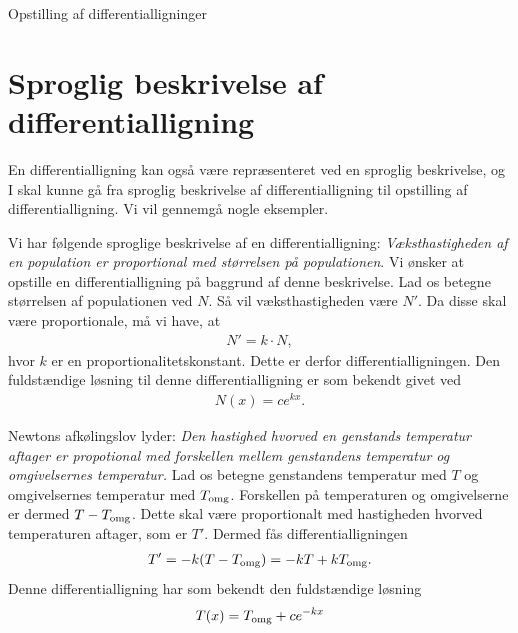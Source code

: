 \begin{center}
	\Huge
	Opstilling af differentialligninger
\end{center}

\section*{Sproglig beskrivelse af differentialligning}

En differentialligning kan også være repræsenteret ved en sproglig beskrivelse, og I skal kunne gå fra sproglig beskrivelse af differentialligning til opstilling af differentialligning. Vi vil gennemgå nogle eksempler. 

\begin{exa}
	Vi har følgende sproglige beskrivelse af en differentialligning: \textit{Væksthastigheden af en population er proportional med størrelsen på populationen}. Vi ønsker at opstille en
	differentialligning på baggrund af denne beskrivelse. Lad os betegne størrelsen af populationen ved $N$. Så vil væksthastigheden være $N'$. Da disse skal være proportionale, må vi have, at 
	\begin{align*}
		N' = k\cdot N,
	\end{align*}
	hvor $k$ er en proportionalitetskonstant. Dette er derfor differentialligningen. Den fuldstændige løsning til denne differentialligning er som bekendt givet ved
	\begin{align*}
		N(x) = ce^{kx}.
	\end{align*}
\end{exa}
\begin{exa}
	Newtons afkølingslov lyder: \textit{Den hastighed hvorved en genstands temperatur aftager er propotional med forskellen mellem genstandens temperatur og omgivelsernes temperatur.} Lad os betegne
	genstandens temperatur med $T$ og omgivelsernes temperatur med $T_{\textnormal{omg}}$. Forskellen på temperaturen og omgivelserne er dermed $T-T_{\textnormal{omg}}$. Dette skal være proportionalt 
	med hastigheden hvorved temperaturen aftager, som er $T'$. Dermed fås differentialligningen
	\begin{align*}
		T' = -k(T-T_{\textnormal{omg}}) = -kT + kT_{\textnormal{omg}}.
	\end{align*}
	Denne differentialligning har som bekendt den fuldstændige løsning
	\begin{align*}
		T(x) = T_{\textnormal{omg}} +ce^{-kx}
	\end{align*}
\end{exa}

